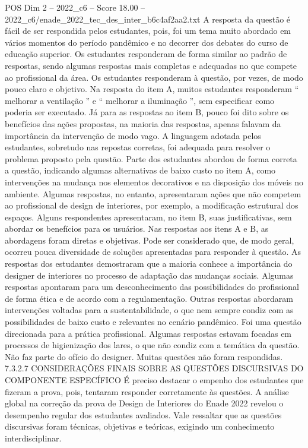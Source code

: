 \begin{textsample}{POS Dim 2 – 2022\_c6 – Score 18.00 – 2022\_c6/enade\_2022\_tec\_des\_inter\_b6c4af2aa2.txt}
A resposta da questão é fácil de ser respondida pelos estudantes, pois, foi um tema muito abordado em vários momentos do período pandêmico e no decorrer dos debates do curso de educação superior.
Os estudantes responderam de forma similar ao padrão de respostas, sendo algumas respostas mais completas e adequadas no que compete ao profissional da área.
Os estudantes responderam à questão, por vezes, de modo pouco claro e objetivo.
Na resposta do item A, muitos estudantes responderam “ melhorar a ventilação ” e “ melhorar a iluminação ”, sem especificar como poderia ser executado.
Já para as respostas ao item B, pouco foi dito sobre os benefícios das ações propostas, na maioria das respostas, apenas falavam da importância da intervenção de modo vago.
A linguagem adotada pelos estudantes, sobretudo nas repostas corretas, foi adequada para resolver o problema proposto pela questão.
Parte dos estudantes abordou de forma correta a questão, indicando algumas alternativas de baixo custo no item A, como intervenções na mudança nos elementos decorativos e na disposição dos móveis no ambiente.
Algumas respostas, no entanto, apresentaram ações que não competem ao profissional de design de interiores, por exemplo, a modificação estrutural dos espaços.
Alguns respondentes apresentaram, no item B, suas justificativas, sem abordar os benefícios para os usuários.
Nas respostas aos itens A e B, as abordagens foram diretas e objetivas.
Pode ser considerado que, de modo geral, ocorreu pouca diversidade de soluções apresentadas para responder à questão.
As respostas dos estudantes demostraram que a maioria conhece a importância do designer de interiores no processo de adaptação das mudanças sociais.
Algumas respostas apontaram para um desconhecimento das possibilidades do profissional de forma ética e de acordo com a regulamentação.
Outras respostas abordaram intervenções voltadas para a sustentabilidade, o que nem sempre condiz com as possibilidades de baixo custo e relevantes no cenário pandêmico.
Foi uma questão direcionada para a prática profissional.
Algumas respostas estavam focadas em processos de higienização dos lares, o que não condiz com a temática da questão.
Não faz parte do ofício do designer.
Muitas questões não foram respondidas. 7.3.2.7 CONSIDERAÇÕES FINAIS SOBRE AS QUESTÕES DISCURSIVAS DO COMPONENTE ESPECÍFICO É preciso destacar o empenho dos estudantes que fizeram a prova, pois, tentaram responder corretamente às questões.
A análise global na correção da prova de Design de Interiores do Enade 2022 revelou o desempenho regular dos estudantes avaliados.
Vale ressaltar que as questões discursivas foram técnicas, objetivas e teóricas, exigindo um conhecimento interdisciplinar.

\end{textsample}
